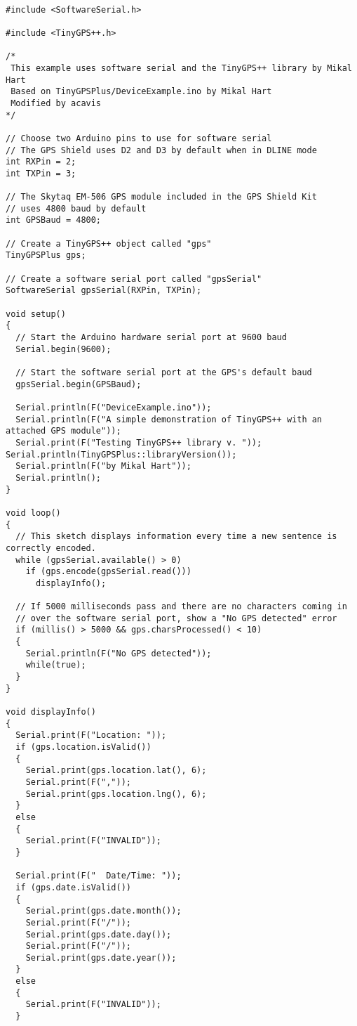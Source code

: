 \begin{verbatim}

#include <SoftwareSerial.h>

#include <TinyGPS++.h>

/*
 This example uses software serial and the TinyGPS++ library by Mikal Hart
 Based on TinyGPSPlus/DeviceExample.ino by Mikal Hart
 Modified by acavis
*/

// Choose two Arduino pins to use for software serial
// The GPS Shield uses D2 and D3 by default when in DLINE mode
int RXPin = 2;
int TXPin = 3;

// The Skytaq EM-506 GPS module included in the GPS Shield Kit
// uses 4800 baud by default
int GPSBaud = 4800;

// Create a TinyGPS++ object called "gps"
TinyGPSPlus gps;

// Create a software serial port called "gpsSerial"
SoftwareSerial gpsSerial(RXPin, TXPin);

void setup()
{
  // Start the Arduino hardware serial port at 9600 baud
  Serial.begin(9600);

  // Start the software serial port at the GPS's default baud
  gpsSerial.begin(GPSBaud);

  Serial.println(F("DeviceExample.ino"));
  Serial.println(F("A simple demonstration of TinyGPS++ with an attached GPS module"));
  Serial.print(F("Testing TinyGPS++ library v. ")); Serial.println(TinyGPSPlus::libraryVersion());
  Serial.println(F("by Mikal Hart"));
  Serial.println();
}

void loop()
{
  // This sketch displays information every time a new sentence is correctly encoded.
  while (gpsSerial.available() > 0)
    if (gps.encode(gpsSerial.read()))
      displayInfo();

  // If 5000 milliseconds pass and there are no characters coming in
  // over the software serial port, show a "No GPS detected" error
  if (millis() > 5000 && gps.charsProcessed() < 10)
  {
    Serial.println(F("No GPS detected"));
    while(true);
  }
}

void displayInfo()
{
  Serial.print(F("Location: ")); 
  if (gps.location.isValid())
  {
    Serial.print(gps.location.lat(), 6);
    Serial.print(F(","));
    Serial.print(gps.location.lng(), 6);
  }
  else
  {
    Serial.print(F("INVALID"));
  }

  Serial.print(F("  Date/Time: "));
  if (gps.date.isValid())
  {
    Serial.print(gps.date.month());
    Serial.print(F("/"));
    Serial.print(gps.date.day());
    Serial.print(F("/"));
    Serial.print(gps.date.year());
  }
  else
  {
    Serial.print(F("INVALID"));
  }


\end{verbatim}
